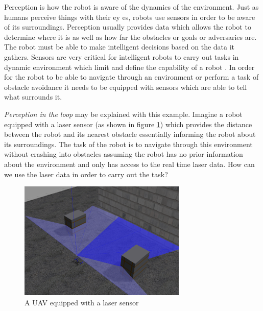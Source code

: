 \documentclass[12pt]{report}
\begin{document}
 Perception is how the robot is aware of the dynamics of the environment. Just as humans perceive things with their ey es, robots use sensors in order to be aware of its surroundings. Perception usually provides data which allows the robot to determine where it is as well as how far the obstacles or goals or adversaries are. The robot must be able to make intelligent decisions based on the data it gathers. Sensors are very critical for intelligent robots to carry out tasks in dynamic environment which limit and define the capability of a robot \cite{tokekar2014placement}. In order for the robot to be able to navigate through an environment or perform a task of obstacle avoidance it needs to be equipped with sensors which are able to tell what surrounds it.\par 
\textit{Perception in the loop} may be explained with this example. Imagine a robot equipped with a laser sensor (as shown in figure \ref{fig:perception_example}) which provides the distance between the robot and its nearest obstacle essentially informing the robot about its surroundings. The task of the robot is to navigate through this environment without crashing into obstacles assuming the robot has no prior information about the environment and only has access to the real time laser data. How can we use the laser data in order to carry out the task?
\begin{figure}[H]
	\centering
	\includegraphics[width=8cm]{perception_1.pdf}
	\caption {A UAV equipped with a laser sensor}
   \label{fig:perception_example}
\end{figure}
\end{document}
